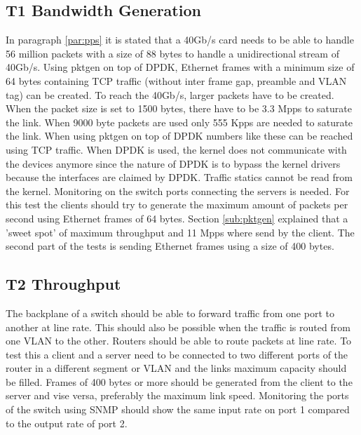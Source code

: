 \subsection{T1 Bandwidth Generation}
In paragraph \ref{par:pps} it is stated that a 40Gb/s card needs to be able to handle 56 million packets with a size of 88 bytes to handle a unidirectional stream of 40Gb/s.
Using pktgen on top of DPDK, Ethernet frames with a minimum size of 64 bytes containing TCP traffic (without inter frame gap, preamble and VLAN tag) can be created. To reach the 40Gb/s, larger packets have to be created. When the packet size is set to 1500 bytes, there have to be 3.3 Mpps to saturate the link. When 9000 byte packets are used only 555 Kpps are needed to saturate the link. When using pktgen on top of DPDK numbers like these can be reached using TCP traffic. When DPDK is used, the kernel does not communicate with the devices anymore since the nature of DPDK is to bypass the kernel drivers because the interfaces are claimed by DPDK. Traffic statics cannot be read from the kernel. Monitoring on the switch ports connecting the servers is needed. 
For this test the clients should try to generate the maximum amount of packets per second using Ethernet frames of 64 bytes. 
Section \ref{sub:pktgen} explained that a 'sweet spot' of maximum throughput and 11 Mpps where send by the client. The second part of the tests is sending Ethernet frames using a size of 400 bytes.  

\subsection{T2 Throughput}
The backplane of a switch should be able to forward traffic from one port to another at line rate. This should also be possible when the traffic is routed from one VLAN to the other. Routers should be able to route packets at line rate. To test this a client and a server need to be connected to two different ports of the router in a different segment or VLAN and the links maximum capacity should be filled. Frames of 400 bytes or more should be generated from the client to the server and vise versa, preferably the maximum link speed. Monitoring the ports of the switch using SNMP should show the same input rate on port 1 compared to the output rate of port 2.    

